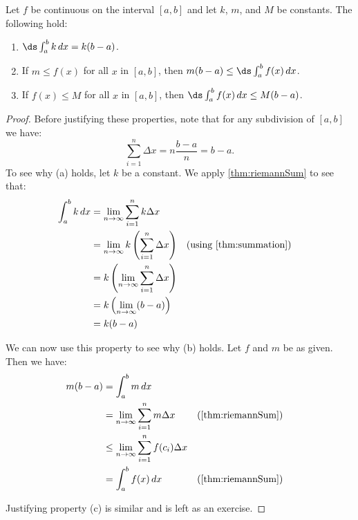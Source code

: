 \begin{theorem}\label{thm:further_def_int_props}
Let $f$ be continuous on the interval $[a,b]$ and let $k$, $m$, and $M$ be constants. The following hold:
\begin{enumerate}
\item $\ds\int_a^b k\,dx=k(b-a)$.
\item If $m\leq f(x)$ for all $x$ in $[a,b]$, then $m(b-a)\leq \ds\int_a^b f(x)\,dx$.
\item If $f(x)\leq M$ for all $x$ in $[a,b]$, then $\ds\int_a^b f(x)\,dx\leq M(b-a)$.
\end{enumerate}
\end{theorem}

\begin{proof}
Before justifying these properties, note that for any subdivision of $[a,b]$ we have: \[\sum_{i=1}^n \Delta x=n\frac{b-a}n=b-a.\]
To see why (a) holds, let $k$ be a constant. We apply \autoref{thm:riemannSum} to see that:
\begin{align*}
\int_a^b k\,dx &=\lim_{n\to\infty}\sum_{i=1}^n k\Delta x\\
&=\lim_{n\to\infty}k\left( \sum_{i=1}^n \Delta x\right)
&&\text{(using \autoref{thm:summation})}\\
&=k\left(\lim_{n\to\infty}\sum_{i=1}^n \Delta x\right)\\
&=k\left( \lim_{n\to\infty} (b-a)\right)\\
&=k(b-a)
\end{align*}

We can now use this property to see why (b) holds. Let $f$ and $m$ be as given. Then we have:
\begin{align*}
m(b-a)&=\int_a^b m\,dx \\
&=\lim_{n\to\infty}\sum_{i=1}^n m\Delta x
&&\text{(\autoref{thm:riemannSum})}\\
&\leq \lim_{n\to\infty}\sum_{i=1}^n f(c_i)\Delta x\\
&=\int_a^b f(x)\,dx &&\text{(\autoref{thm:riemannSum})}
\end{align*}

Justifying property (c) is similar and is left as an exercise.
\end{proof}

